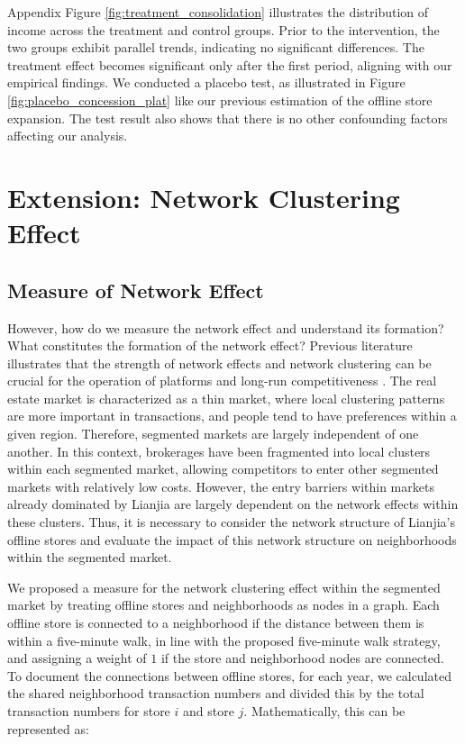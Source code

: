 \documentclass[11pt]{article}
\begin{document}
Appendix Figure \ref{fig:treatment_consolidation} illustrates the distribution of income across the treatment and control groups. Prior to the intervention, the two groups exhibit parallel trends, indicating no significant differences. The treatment effect becomes significant only after the first period, aligning with our empirical findings. We conducted a placebo test, as illustrated in Figure \ref{fig:placebo_concession_plat} like our previous estimation of the offline store expansion. The test result also shows that there is no other confounding factors affecting our analysis.

\section{Extension: Network Clustering Effect} \label{sec:network_effect}

\subsection{Measure of Network Effect} \label{subsec:measure_network_effect}

However, how do we measure the network effect and understand its formation? What constitutes the formation of the network effect? Previous literature illustrates that the strength of network effects and network clustering can be crucial for the operation of platforms and long-run competitiveness \citep{WOS:000454186600016}. The real estate market is characterized as a thin market, where local clustering patterns are more important in transactions, and people tend to have preferences within a given region. Therefore, segmented markets are largely independent of one another. In this context, brokerages have been fragmented into local clusters within each segmented market, allowing competitors to enter other segmented markets with relatively low costs. However, the entry barriers within markets already dominated by Lianjia are largely dependent on the network effects within these clusters. Thus, it is necessary to consider the network structure of Lianjia's offline stores and evaluate the impact of this network structure on neighborhoods within the segmented market.

We proposed a measure for the network clustering effect within the segmented market by treating offline stores and neighborhoods as nodes in a graph. Each offline store is connected to a neighborhood if the distance between them is within a five-minute walk, in line with the proposed five-minute walk strategy, and assigning a weight of $1$ if the store and neighborhood nodes are connected. To document the connections between offline stores, for each year, we calculated the shared neighborhood transaction numbers and divided this by the total transaction numbers for store $i$ and store $j$. Mathematically, this can be represented as:
\end{document}
